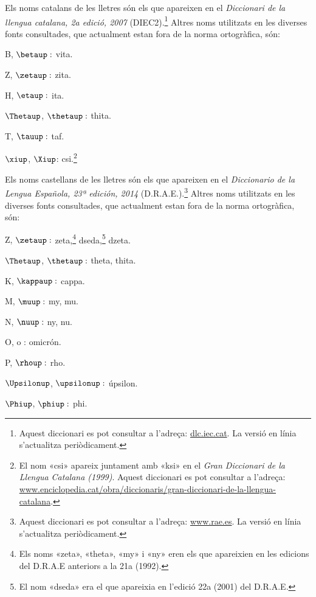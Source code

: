 Els noms catalans de les lletres són els que apareixen en el \textit{Diccionari de la llengua catalana, 2a edició, 2007} (DIEC2).\footnote{Aquest diccionari es pot consultar a l'adreça: \href{http://dlc.iec.cat/}{dlc.iec.cat}. La versió en línia s'actualitza periòdicament.} Altres noms utilitzats en
les diverses fonts consultades, que actualment estan fora de la norma ortogràfica, són:
\begin{multicols}{3}
\begin{list}{}
   {\setlength{\labelwidth}{16mm} \setlength{\leftmargin}{16mm} \setlength{\labelsep}{2mm}}
   \item[B, $\betaup :$] vita.
   \item[Z, $\zetaup :$] zita.
   \item[H, $\etaup :$] ita.
   \item[$\Thetaup$, $\thetaup :$] thita.
   \item[T, $\tauup :$] taf.
   \item[$\xiup$, $\Xiup$:] csi.\footnote{El nom «csi» apareix juntament amb «ksi» en el \textit{Gran Diccionari de la Llengua Catalana (1999)}. Aquest diccionari es pot consultar a l'adreça:  \href{http://www.enciclopedia.cat/obra/diccionaris/gran-diccionari-de-la-llengua-catalana}{www.enciclopedia.cat/obra/diccionaris/gran-diccionari-de-la-llengua-catalana}.}
\end{list}
\end{multicols}

Els noms castellans de les lletres són els que apareixen en el \textit{Diccionario de la Lengua Española, 23ª
edición, 2014} (D.R.A.E.).\footnote{Aquest diccionari es pot consultar a l'adreça:  \href{http://www.rae.es/}{www.rae.es}. La versió en línia s'actualitza periòdicament.} Altres noms utilitzats en les diverses fonts
consultades, que actualment estan fora de la norma ortogràfica, són:
\begin{multicols}{3}
\begin{list}{}
   {\setlength{\labelwidth}{16mm} \setlength{\leftmargin}{16mm} \setlength{\labelsep}{2mm}}
   \item[Z, $\zetaup :$] zeta,\footnote{\label{fn:zeta}Els noms «zeta», «theta», «my» i «ny» eren els que apareixien en les edicions
   del D.R.A.E anteriors a la 21a (1992).} dseda,\footnote{El nom «dseda» era el que apareixia en l'edició 22a (2001) del D.R.A.E.} dzeta.
   \item[$\Thetaup$, $\thetaup :$] theta, thita.
   \item[K, $\kappaup :$] cappa.
   \item[M, $\muup :$] my, mu.
   \item[N, $\nuup :$] ny, nu.
   \item[O, o :] omicrón.
   \item[P, $\rhoup :$] rho.
   \item[$\Upsilonup$, $\upsilonup :$] úpsilon.
   \item[$\Phiup$, $\phiup :$] phi.
\end{list}
\end{multicols}

